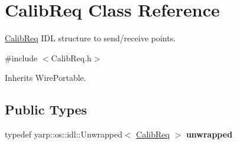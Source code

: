 \section{Calib\+Req Class Reference}
\label{classCalibReq}


\mbox{\hyperlink{classCalibReq}{Calib\+Req}} I\+DL structure to send/receive points.  




{\ttfamily \#include $<$Calib\+Req.\+h$>$}



Inherits Wire\+Portable.

\subsection*{Public Types}
\begin{DoxyCompactItemize}
\item 
\mbox{\label{classCalibReq_a4df421184d5b6cbbabdb33e3a32f639b}} 
typedef yarp\+::os\+::idl\+::\+Unwrapped$<$ \mbox{\hyperlink{classCalibReq}{Calib\+Req}} $>$ {\bfseries unwrapped}
\end{DoxyCompactItemize}
